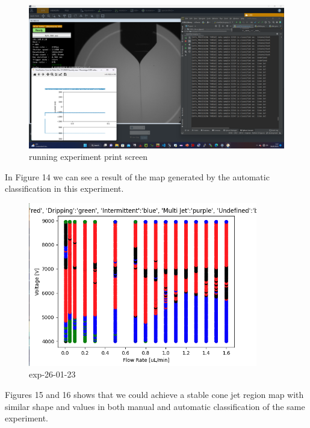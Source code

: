 \begin{figure}[H]
    \center
    \includegraphics[width=17cm]{Figuras/report3/screenshots/stableConeExp.png}
    \caption{running experiment print screen}
\end{figure}

In Figure 14 we can see a result of the map generated by the automatic classification in this experiment.

\begin{figure}[H]
    \center
    \includegraphics[width=10cm]{Figuras/report3/map-exp-26-01.png}
    \caption{ exp-26-01-23 }
\end{figure}

\pagebreak

Figures 15 and 16 shows that we could achieve a stable cone jet region map with similar shape and values in both manual and automatic classification of the same experiment.

